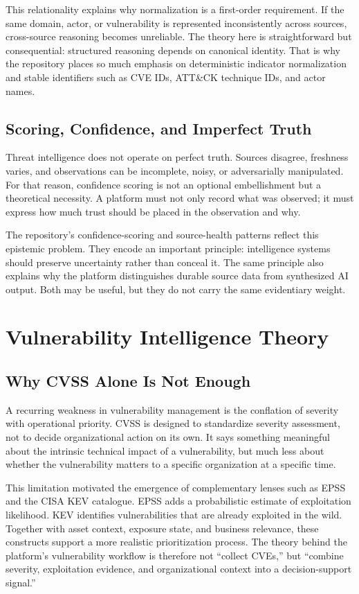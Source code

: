 This relationality explains why normalization is a first-order requirement. If the same domain, actor, or vulnerability is represented inconsistently across sources, cross-source reasoning becomes unreliable. The theory here is straightforward but consequential: structured reasoning depends on canonical identity. That is why the repository places so much emphasis on deterministic indicator normalization and stable identifiers such as CVE IDs, ATT\&CK technique IDs, and actor names.

\subsection{Scoring, Confidence, and Imperfect Truth}
Threat intelligence does not operate on perfect truth. Sources disagree, freshness varies, and observations can be incomplete, noisy, or adversarially manipulated. For that reason, confidence scoring is not an optional embellishment but a theoretical necessity. A platform must not only record what was observed; it must express how much trust should be placed in the observation and why.

The repository's confidence-scoring and source-health patterns reflect this epistemic problem. They encode an important principle: intelligence systems should preserve uncertainty rather than conceal it. The same principle also explains why the platform distinguishes durable source data from synthesized AI output. Both may be useful, but they do not carry the same evidentiary weight.

\section{Vulnerability Intelligence Theory}
\subsection{Why CVSS Alone Is Not Enough}
A recurring weakness in vulnerability management is the conflation of severity with operational priority. CVSS is designed to standardize severity assessment, not to decide organizational action on its own. It says something meaningful about the intrinsic technical impact of a vulnerability, but much less about whether the vulnerability matters to a specific organization at a specific time.

This limitation motivated the emergence of complementary lenses such as EPSS and the CISA KEV catalogue. EPSS adds a probabilistic estimate of exploitation likelihood. KEV identifies vulnerabilities that are already exploited in the wild. Together with asset context, exposure state, and business relevance, these constructs support a more realistic prioritization process. The theory behind the platform's vulnerability workflow is therefore not ``collect CVEs,'' but ``combine severity, exploitation evidence, and organizational context into a decision-support signal.''

